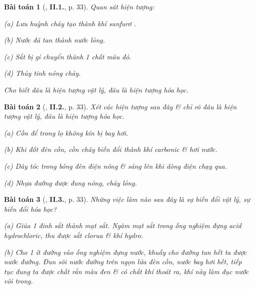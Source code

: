 \documentclass{article}
\numberwithin{equation}{section}
\newtheorem{baitoan}{Bài toán}
\begin{document}
\begin{baitoan}[\cite{Truong_BTNC_Hoa_Hoc_8_2022}, \textbf{II.1.}, p. 33]
	Quan sát hiện tượng:
	\begin{enumerate*}
		\item[(a)] Lưu huỳnh cháy tạo thành khí sunfurơ \emph{}.
		\item[(b)] Nước đá tan thành nước lỏng.
		\item[(c)] Sắt bị gỉ chuyển thành 1 chất màu đỏ.
		\item[(d)] Thủy tinh nóng chảy.
	\end{enumerate*}
	Cho biết đâu là hiện tượng vật lý, đâu là hiện tượng hóa học.
\end{baitoan}

\begin{baitoan}[\cite{Truong_BTNC_Hoa_Hoc_8_2022}, \textbf{II.2.}, p. 33]
	Xét các hiện tượng sau đây \& chỉ rõ đâu là hiện tượng vật lý, đâu là hiện tượng hóa học.
	\begin{enumerate*}
		\item[(a)] Cồn để trong lọ không kín bị bay hơi.
		\item[(b)] Khi đốt đèn cồn, cồn cháy biến đổi thành khí carbonic \& hơi nước.
		\item[(c)] Dây tóc trong bóng đèn điện nóng \& sáng lên khi dòng điện chạy qua.
		\item[(d)] Nhựa đường được đung nóng, chảy lỏng.
	\end{enumerate*}
\end{baitoan}

\begin{baitoan}[\cite{Truong_BTNC_Hoa_Hoc_8_2022}, \textbf{II.3.}, p. 33]
	Những việc làm nào sau đây là sự biến đổi vật lý, sự biến đổi hóa học?
	\begin{enumerate*}
		\item[(a)] Giũa 1 đinh sắt thành mạt sắt. Ngâm mạt sắt trong ống nghiệm đựng acid hydrochloric, thu được sắt clorua \& khí hydro.
		\item[(b)] Cho 1 ít đường vào ống nghiệm đựng nước, khuấy cho đường tan hết ta được nước đường. Đun sôi nước đường trên ngọn lửa đèn cồn, nước bay hơi hết, tiếp tục đung ta được chất rắn màu đen \& có chất khí thoát ra, khí này làm đục nước vôi trong.
	\end{enumerate*}
\end{baitoan}
\end{document}
